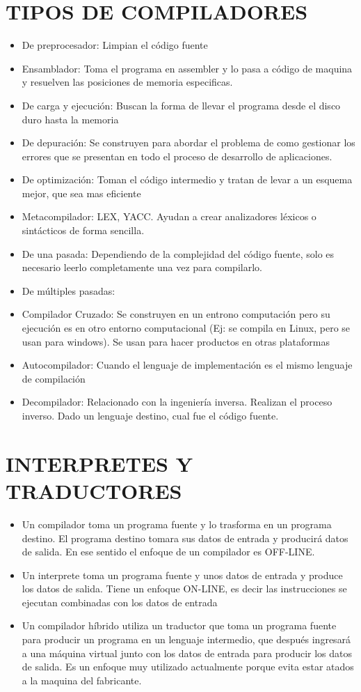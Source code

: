\section{TIPOS DE COMPILADORES}
\begin{itemize}
    \item De preprocesador: Limpian el código fuente
    \item Ensamblador: Toma el programa en assembler y lo pasa a código de maquina y resuelven las posiciones de memoria especificas.
    \item De carga y ejecución: Buscan la forma de llevar el programa desde el disco duro hasta la memoria
    \item De depuración: Se construyen para abordar el problema de como gestionar los errores que se presentan en todo el proceso de desarrollo de aplicaciones.
    \item De optimización: Toman el código intermedio y tratan de levar a un esquema mejor, que sea mas eficiente
    \item Metacompilador: LEX, YACC. Ayudan a crear analizadores léxicos o sintácticos de forma sencilla.
    \item De una pasada: Dependiendo de la complejidad del código fuente, solo es necesario leerlo completamente una vez para compilarlo.
    \item De múltiples pasadas:
    \item Compilador Cruzado: Se construyen en un entrono computación pero su ejecución es en otro entorno computacional (Ej: se compila en Linux, pero se usan para windows). Se usan para hacer productos en otras plataformas
    \item Autocompilador: Cuando el lenguaje de implementación es el mismo lenguaje de compilación
    \item Decompilador: Relacionado con la ingeniería inversa. Realizan el proceso inverso. Dado un lenguaje destino, cual fue el código fuente.
    
    
\end{itemize}


\section{INTERPRETES Y TRADUCTORES}
\begin{itemize}
 \item Un compilador toma un programa fuente y lo trasforma en un programa destino. El programa destino tomara sus datos de entrada y producirá datos de salida. En ese sentido el enfoque de un compilador es OFF-LINE.
\item Un interprete toma un programa fuente y unos datos de entrada y produce los datos de salida. Tiene un enfoque ON-LINE, es decir las instrucciones se ejecutan combinadas con los datos de entrada
\item Un compilador híbrido utiliza un traductor que toma un programa fuente para producir un programa en un lenguaje intermedio, que después ingresará a una máquina virtual junto con los datos de entrada para producir los datos de salida. Es un enfoque muy utilizado actualmente porque evita estar atados a la maquina del fabricante.
\end{itemize}
